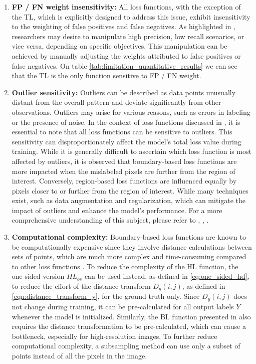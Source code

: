 \begin{enumerate}
  \item \textbf{FP / FN weight insensitivity:} All loss functions, with the exception of the \acf{TL}, which is explicitly designed to address this issue, exhibit insensitivity to the weighting of false positives and false negatives. As highlighted in , researchers may desire to manipulate high precision, low recall scenarios, or vice versa, depending on specific objectives. This manipulation can be achieved by manually adjusting the weights attributed to false positives or false negatives. On table \ref{tab:limitation_quantitative_results} we can see that the \ac{TL} is the only function sensitive to FP / FN weight.
  \item \textbf{Outlier sensitivity:} Outliers can be described as data points unusually distant from the overall pattern and deviate significantly from other observations. Outliers may arise for various reasons, such as errors in labeling or the presence of noise. In the context of loss functions discussed in , it is essential to note that all loss functions can be sensitive to outliers. This sensitivity can disproportionately affect the model's total loss value during training. While it is generally difficult to ascertain which loss function is most affected by outliers, it is observed that boundary-based loss functions are more impacted when the mislabeled pixels are further from the region of interest. Conversely, region-based loss functions are influenced equally by pixels closer to or further from the region of interest. While many techniques exist, such as data augmentation and regularization, which can mitigate the impact of outliers and enhance the model's performance. For a more comprehensive understanding of this subject, please refer to \cite{Cho_2023_WACV}, \cite{DBLP:journals/corr/abs-1802-09129}, \cite{bevandi2019simultaneous}.
  \item \textbf{Computational complexity:} Boundary-based loss functions are known to be computationally expensive since they involve distance calculations between sets of points, which are much more complex and time-consuming compared to other loss functions \cite{Kervadec_2021}. To reduce the complexity of the \ac{HL} function, the one-sided version $HL_{os}$ can be used instead, as defined in \ref{eq:one_sided_hd}, to reduce the effort of the distance transform $D_y(i,j)$, as defined in \ref{eqn:distance_transform_y}, for the ground truth only. Since $D_y(i,j)$ does not change during training, it can be pre-calculated for all output labels $Y$ whenever the model is initialized. Similarly, the \ac{BL} function presented in  also requires the distance transformation to be pre-calculated, which can cause a bottleneck, especially for high-resolution images. To further reduce computational complexity, a subsampling method can use only a subset of points instead of all the pixels in the image.

\end{enumerate}
